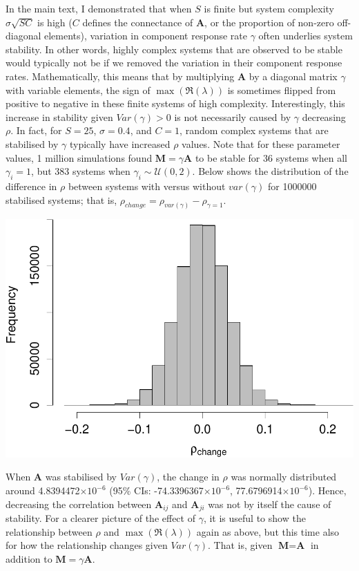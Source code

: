 \documentclass[]{article}
\begin{document}
In the main text, I demonstrated that when \(S\) is finite but system
complexity \(\sigma\sqrt{SC}\) is high (\(C\) defines the connectance of
\(\textbf{A}\), or the proportion of non-zero off-diagonal elements),
variation in component response rate \(\gamma\) often underlies system
stability. In other words, highly complex systems that are observed to
be stable would typically not be if we removed the variation in their
component response rates. Mathematically, this means that by multiplying
\(\textbf{A}\) by a diagonal matrix \(\gamma\) with variable elements,
the sign of \(\max(\Re(\lambda))\) is sometimes flipped from positive to
negative in these finite systems of high complexity. Interestingly, this
increase in stability given \(Var(\gamma) > 0\) is not necessarily
caused by \(\gamma\) decreasing \(\rho\). In fact, for \(S = 25\),
\(\sigma = 0.4\), and \(C = 1\), random complex systems that are
stabilised by \(\gamma\) typically have increased \(\rho\) values. Note
that for these parameter values, 1 million simulations found
\(\textbf{M} = \gamma \textbf{A}\) to be stable for 36 systems when all
\(\gamma_{i} = 1\), but 383 systems when
\(\gamma_{i} \sim \mathcal{U}(0, 2)\). Below shows the distribution of
the difference in \(\rho\) between systems with versus without
\(var(\gamma)\) for 1000000 stabilised systems; that is,
\(\rho_{change} = \rho_{var(\gamma)} - \rho_{\gamma = 1}\).

\includegraphics{revision_notes_files/figure-latex/unnamed-chunk-10-1.pdf}

When \(\textbf{A}\) was stabilised by \(Var(\gamma)\), the change in
\(\rho\) was normally distributed around 4.8394472\(\times 10^{-6}\)
(95\% CIs: -74.3396367\(\times 10^{-6}\), 77.6796914\(\times 10^{-6}\)).
Hence, decreasing the correlation between \(\textbf{A}_{ij}\) and
\(\textbf{A}_{ji}\) was not by itself the cause of stability. For a
clearer picture of the effect of \(\gamma\), it is useful to show the
relationship between \(\rho\) and \(\max(\Re(\lambda))\) again as above,
but this time also for how the relationship changes given
\(Var(\gamma)\). That is, given \(\textbf{M} = \textbf{A}\) in addition
to \(\textbf{M} = \gamma\textbf{A}\).
\end{document}
